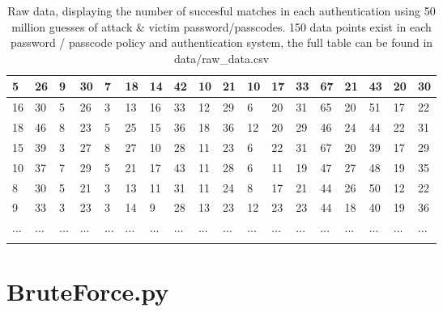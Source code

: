 \documentclass[british,10pt,a4paper]{article}
\begin{document}
\begin{appendices}
\begin{longtable}{|l|l|l|l|l|l|l|l|l|l|l|l|l|l|l|l|l|l|}
	5 & 26 & 9 & 30 & 7 & 18 & 14 & 42 & 10 & 21 & 10 & 17 & 33 & 67 & 21 & 43 & 20 & 30 \\ \hline
	16 & 30 & 5 & 26 & 3 & 13 & 16 & 33 & 12 & 29 & 6 & 20 & 31 & 65 & 20 & 51 & 17 & 22 \\ \hline
	18 & 46 & 8 & 23 & 5 & 25 & 15 & 36 & 18 & 36 & 12 & 20 & 29 & 46 & 24 & 44 & 22 & 31 \\ \hline
	15 & 39 & 3 & 27 & 8 & 27 & 10 & 28 & 11 & 23 & 6 & 22 & 31 & 67 & 20 & 39 & 17 & 29 \\ \hline
	10 & 37 & 7 & 29 & 5 & 21 & 17 & 43 & 11 & 28 & 6 & 11 & 19 & 47 & 27 & 48 & 19 & 35 \\ \hline
	8 & 30 & 5 & 21 & 3 & 13 & 11 & 31 & 11 & 24 & 8 & 17 & 21 & 44 & 26 & 50 & 12 & 22 \\ \hline
	9 & 33 & 3 & 23 & 3 & 14 & 9 & 28 & 13 & 23 & 12 & 23 & 23 & 44 & 18 & 40 & 19 & 36 \\ \hline
	... & ... & ...& ... & ...& ... & ...& ... & ... & ... & ...& ... & ... & ... & ... & ... & ... & ... \\ \hline
		\caption{Raw data, displaying the number of succesful matches in each authentication using 50 million guesses of attack \& victim password/passcodes. 150 data points exist in each password / passcode policy and authentication system, the full table can be found in data/raw\_data.csv}
	\label{tab:raw_data}
	\end{longtable}

	\clearpage

	\section{BruteForce.py}\label{app:bruteforce}
	
	\clearpage


\end{appendices}
\end{document}
